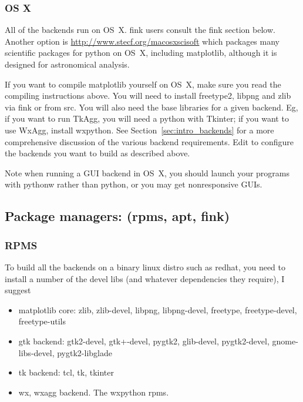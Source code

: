 \documentclass[twoside]{book}
\begin{document}
\subsubsection{OS X}
\label{sec:osx}

All of the backends run on OS~X.  fink users consult the fink section
below.  Another option is \url{http://www.stecf.org/macosxscisoft}
which packages many scientific packages for python on OS~X, including
matplotlib, although it is designed for astronomical analysis.

If you want to compile matplotlib yourself on OS~X, make sure you read the
compiling instructions above.  You will need to install freetype2,
libpng and zlib via fink or from src.  You will also need the base
libraries for a given backend.  Eg, if you want to run TkAgg, you will
need a python with Tkinter; if you want to use WxAgg, install
wxpython.  See Section~\ref{sec:intro_backends} for a more comprehensive
discussion of the various backend requirements.  Edit 
to configure the backends you want to build as described above.

Note when running a GUI backend in OS~X, you should launch your
programs with pythonw rather than python, or you may get
nonresponsive GUIs.

\subsection{Package managers: (rpms, apt, fink)}

\subsubsection{RPMS}
\label{sec:rpms}

To build all the backends on a binary linux distro such as redhat, you
need to install a number of the devel libs (and whatever dependencies
they require), I suggest
\begin{itemize}
  
\item matplotlib core: zlib, zlib-devel, libpng, libpng-devel,
  freetype, freetype-devel, freetype-utils
  
\item gtk backend: gtk2-devel, gtk+-devel, pygtk2, glib-devel,
  pygtk2-devel, gnome-libs-devel, pygtk2-libglade

\item tk backend: tcl, tk, tkinter

\item wx, wxagg backend.  The wxpython rpms.
\end{itemize}
\end{document}
